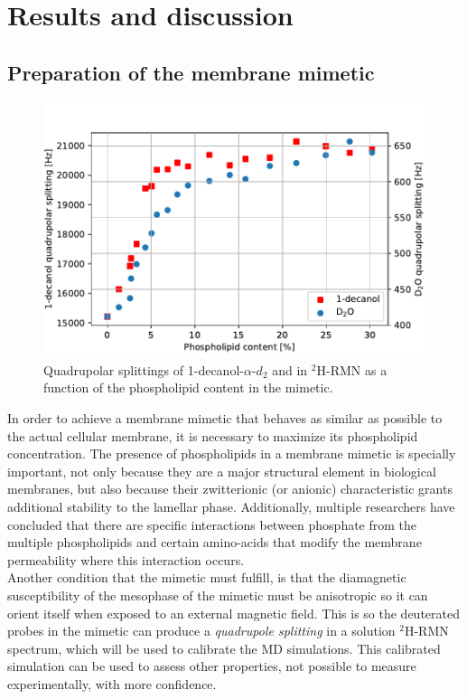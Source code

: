 \documentclass[3p,preprint,review]{elsarticle}
\begin{document}
	\section{Results and discussion}
	
	\subsection{Preparation of the membrane mimetic}
	
	\begin{figure}[h]
		\centering
		\includegraphics[width=\columnwidth]{splitting_v_phospholipid}
		\caption{Quadrupolar splittings of 1-decanol-$\alpha$-$d_2$ and  in
			$^2$H-RMN as a function of the phospholipid content in the mimetic.}
		\label{fig:1st_max}
	\end{figure}
	
	In order to achieve a membrane mimetic that behaves as similar as possible to
  the actual cellular membrane, it is necessary to maximize its phospholipid
  concentration. The presence of phospholipids in a membrane mimetic is
  specially important, not only because they are a major structural element in
  biological membranes, but also because their zwitterionic (or anionic)
  characteristic grants additional stability to the lamellar phase.
  Additionally, multiple researchers have concluded that there are
  specific interactions between phosphate from the multiple phospholipids and
  certain amino-acids that modify the membrane
	permeability where this interaction occurs\cite{Aliaga2011,Hristova2011}.\\
  
	Another condition that the mimetic must fulfill, is that the diamagnetic susceptibility of the mesophase of the mimetic must be anisotropic so it can orient itself when exposed to an external magnetic field. This is so the
  deuterated probes in the mimetic can produce a \textit{quadrupole splitting}
  in a solution $^2$H-RMN spectrum, which will be used to calibrate the MD
  simulations. This calibrated simulation can be used to assess other
  properties, not possible to measure experimentally, with more
	confidence.\\
	
\end{document}
